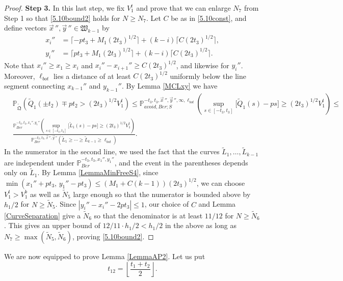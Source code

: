 \begin{proof}
	\noindent\textbf{Step 3.} In this last step, we fix $V_1^t$ and prove that we can enlarge $N_7$ from Step 1 so that \eqref{5.10bound2} holds for $N\geq N_7$. Let $C$ be as in \eqref{5.10const}, and define vectors $\vec{x}\,'', \vec{y}\,''\in\mathfrak{W}_{k-1}$ by
	\begin{align*}
	x_i'' &= \lceil -pt_3 + M_1(2t_3)^{1/2}\rceil + (k-i)\lceil C(2t_3)^{1/2}\rceil,\\
	y_i'' &= \lceil pt_3 + M_1(2t_3)^{1/2}\rceil + (k-i)\lceil C(2t_3)^{1/2}\rceil.
	\end{align*}
	Note that $x_i'' \geq x_1 \geq x_i$ and $x_i''-x_{i+1}'' \geq C(2t_3)^{1/2}$, and likewise for $y_i''$. Moreover, $\ell_{bot}$ lies a distance of at least $C(2t_3)^{1/2}$ uniformly below the line segment connecting $x_{k-1}''$ and $y_{k-1}''$. By Lemma \ref{MCLxy} we have
	\begin{align*}
	&\mathbb{P}_{\tilde{\mathfrak{Q}}}\left(\tilde{Q}_1(\pm t_2) \mp pt_2 > (2t_3)^{1/2}V_1^t\right) \leq \mathbb{P}^{-t_3,t_3,\vec{x}\,'',\vec{y}\,'',\infty,\ell_{bot}}_{avoid,Ber;S}\left(\sup_{s\in[-t_3,t_3]} \big[\tilde{Q}_1(s)-ps\big] \geq (2t_3)^{1/2}V_1^t\right)\leq\\
	& \frac{\mathbb{P}^{-t_3,t_3,x_1'',y_1''}_{Ber}\left(\sup_{s\in[-t_3,t_3]} \big[\tilde{L}_1(s)-ps\big] \geq (2t_3)^{1/2}V_1^t\right)}{\mathbb{P}^{-t_3,t_3,\vec{x}\,'',\vec{y}\,''}_{Ber}\left(\tilde{L}_1\geq\cdots\geq\tilde{L}_{k-1}\geq\ell_{bot}\right)}.
	\end{align*}
	In the numerator in the second line, we used the fact that the curves $\tilde{L}_1,\dots,\tilde{L}_{k-1}$ are independent under $\mathbb{P}^{-t_3,t_3,x_1'',y_1''}_{Ber}$, and the event in the parentheses depends only on $\tilde{L}_1$. By Lemma \ref{LemmaMinFreeS4}, since $\min(x_1'' + pt_3, \, y_1'' - pt_3) \leq (M_1+C(k-1))(2t_3)^{1/2}$, we can choose $V_1^t > V_1^b$ as well as $\tilde{N}_5$ large enough so that the numerator is bounded above by $h_1/2$ for $N\geq\tilde{N}_5$. Since $|y_i'' - x_i'' - 2pt_3| \leq 1$, our choice of $C$ and Lemma \ref{CurveSeparation} give a $\tilde{N}_6$ so that the denominator is at least $11/12$ for $N\geq\tilde{N}_6$. This gives an upper bound of $12/11\cdot h_1/2 < h_1/2$ in the above as long as $N_7\geq\max(\tilde{N}_5,\tilde{N}_6)$, proving \eqref{5.10bound2}.
	
	
\end{proof}

We are now equipped to prove Lemma \ref{LemmaAP2}. Let us put
\begin{equation}\label{t12}
t_{12} = \left\lfloor \frac{t_1+t_2}{2}\right\rfloor.
\end{equation}

